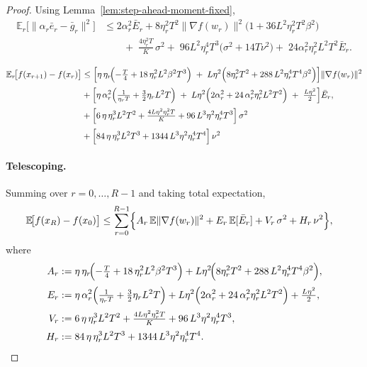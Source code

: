 \documentclass{article} %
\newcommand{\E}{\mathbb{E}}
\begin{document}
\begin{proof}
Using Lemma~\ref{lem:step-ahead-moment-fixed},
\[
\begin{aligned}
\E_r\!\bigl[\|\alpha_r\bar e_r-\bar g_r\|^{2}\bigr]
&\le 
2\alpha_r^{2}\bar E_r
+ 8\eta_r^{2}T^{2}\|\nabla f(w_r)\|^{2}\bigl(1+36L^{2}\eta_r^{2}T^{2}\beta^{2}\bigr) \\
&\qquad
+\;\frac{4\eta_r^{2}T}{K}\,\sigma^{2}
+\;96L^{2}\eta_r^{4}T^{3}\bigl(\sigma^{2}+14T\nu^{2}\bigr)
+\;24\alpha_r^{2}\eta_r^{2}L^{2}T^{2}\bar E_r.
\end{aligned}
\]

\begin{align}
\E_r\!\bigl[f(x_{r+1})-f(x_r)\bigr]
&\le \Bigl[\eta\,\eta_r\!\Bigl(-\tfrac{T}{4}
+ 18\,\eta_r^{2}L^{2}\beta^{2}T^{3}\Bigr)
\;+\; L\eta^{2}\Bigl(8\eta_r^{2}T^{2}
+ 288\,L^{2}\eta_r^{4}T^{4}\beta^{2}\Bigr)\Bigr]\|\nabla f(w_r)\|^{2}\notag\\[2pt]
&+
\Bigl[\eta\,\alpha_r^{2}\Bigl(\tfrac{1}{\eta_r T}+\tfrac{3}{2}\eta_r L^{2}T\Bigr)
\;+\; L\eta^{2}\Bigl(2\alpha_r^{2}
+24\,\alpha_r^{2}\eta_r^{2}L^{2}T^{2}\Bigr)
\;+\;\tfrac{L\eta^{2}}{2}\Bigr]\bar E_r, \notag\\[2pt]
&+\Bigl[
6\,\eta\,\eta_r^{3}L^{2}T^{2}
+ \tfrac{4L\eta^{2}\eta_r^{2}T}{K}
+ 96\,L^{3}\eta^{2}\eta_r^{4}T^{3}
\Bigr]\,\sigma^{2} \notag\\[2pt]
&+\Bigl[
84\,\eta\,\eta_r^{3}L^{2}T^{3}
+ 1344\,L^{3}\eta^{2}\eta_r^{4}T^{4}
\Bigr]\,\nu^{2}
\end{align}


\paragraph{Telescoping.}
Summing over $r=0,\dots,R-1$ and taking total expectation,
\begin{align}
\E\!\bigl[f(x_{R})-f(x_0)\bigr]
&\le \sum_{r=0}^{R-1}\Bigl\{
A_r\,\E\|\nabla f(w_r)\|^{2}
+ E_r\,\E[\bar E_r]
+ V_r\,\sigma^{2}
+ H_r\,\nu^{2}\Bigr\},\label{eq:telescoped-raw}
\end{align}
where
\[
\begin{aligned}
A_r
&:= \eta\,\eta_r\!\Bigl(-\tfrac{T}{4}
+ 18\,\eta_r^{2}L^{2}\beta^{2}T^{3}\Bigr)
+ L\eta^{2}\!\Bigl(8\eta_r^{2}T^{2}
+ 288\,L^{2}\eta_r^{4}T^{4}\beta^{2}\Bigr),\\[2pt]
E_r
&:= \eta\,\alpha_r^{2}\Bigl(\tfrac{1}{\eta_r T}+\tfrac{3}{2}\eta_r L^{2}T\Bigr)
+ L\eta^{2}\Bigl(2\alpha_r^{2}
+24\,\alpha_r^{2}\eta_r^{2}L^{2}T^{2}\Bigr)
+ \tfrac{L\eta^{2}}{2},\\[2pt]
V_r
&:= 6\,\eta\,\eta_r^{3}L^{2}T^{2}
+ \tfrac{4L\eta^{2}\eta_r^{2}T}{K}
+ 96\,L^{3}\eta^{2}\eta_r^{4}T^{3},\\[2pt]
H_r
&:= 84\,\eta\,\eta_r^{3}L^{2}T^{3}
+ 1344\,L^{3}\eta^{2}\eta_r^{4}T^{4}.
\end{aligned}
\]


\end{proof}
\end{document}
